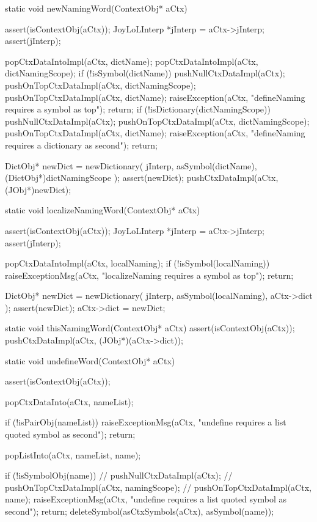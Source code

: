 \startCCode
static void newNamingWord(ContextObj* aCtx) {
  assert(isContextObj(aCtx));
  JoyLoLInterp *jInterp = aCtx->jInterp;
  assert(jInterp);

  popCtxDataIntoImpl(aCtx, dictName);
  popCtxDataIntoImpl(aCtx, dictNamingScope);
  if (!isSymbol(dictName)) {
    pushNullCtxDataImpl(aCtx);
    pushOnTopCtxDataImpl(aCtx, dictNamingScope);
    pushOnTopCtxDataImpl(aCtx, dictName);
    raiseException(aCtx,
      "defineNaming requires a symbol as top");
    return;
  }
  if (!isDictionary(dictNamingScope)) {
    pushNullCtxDataImpl(aCtx);
    pushOnTopCtxDataImpl(aCtx, dictNamingScope);
    pushOnTopCtxDataImpl(aCtx, dictName);
    raiseException(aCtx,
      "defineNaming requires a dictionary as second");
    return;
  }

  DictObj* newDict =
    newDictionary(
      jInterp,
      asSymbol(dictName),
      (DictObj*)dictNamingScope
    );
  assert(newDict);
  pushCtxDataImpl(aCtx, (JObj*)newDict);
}
\stopCCode

\startCCode
static void localizeNamingWord(ContextObj* aCtx) {
  assert(isContextObj(aCtx));
  JoyLoLInterp *jInterp = aCtx->jInterp;
  assert(jInterp);
  
  popCtxDataIntoImpl(aCtx, localNaming);
  if (!isSymbol(localNaming)){
    raiseExceptionMsg(aCtx,
      "localizeNaming requires a symbol as top");
    return;
  }
  
  DictObj* newDict = 
    newDictionary(
      jInterp,
      asSymbol(localNaming),
      aCtx->dict
    );
  assert(newDict);
  aCtx->dict = newDict;
}
\stopCCode

\startCCode
static void thisNamingWord(ContextObj* aCtx) {
  assert(isContextObj(aCtx));
  pushCtxDataImpl(aCtx, (JObj*)(aCtx->dict));
}
\stopCCode
\stoptyping

\startCCode
static void undefineWord(ContextObj* aCtx) {
  assert(isContextObj(aCtx));
  
  popCtxDataInto(aCtx, nameList);

  if (!isPairObj(nameList)) {
    raiseExceptionMsg(aCtx,
      "undefine requires a list quoted symbol as second");
    return;
  }
  
  popListInto(aCtx, nameList, name);
  
  if (!isSymbolObj(name)) {
//    pushNullCtxDataImpl(aCtx);
//    pushOnTopCtxDataImpl(aCtx, namingScope);
//    pushOnTopCtxDataImpl(aCtx, name);
    raiseExceptionMsg(aCtx,
      "undefine requires a list quoted symbol as second");
    return;
  }
  deleteSymbol(asCtxSymbols(aCtx), asSymbol(name));
  }
\stopCCode


